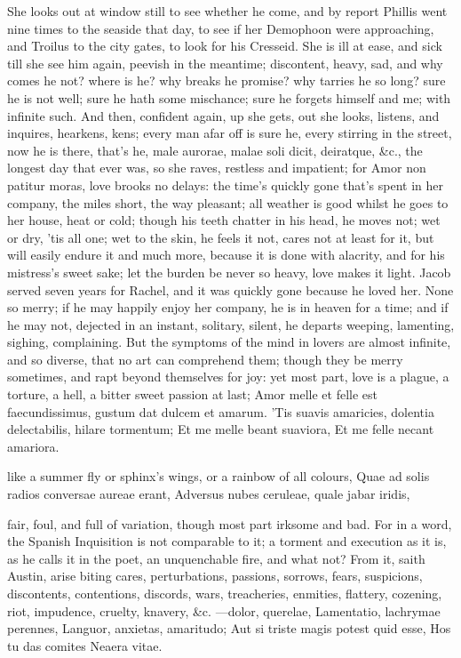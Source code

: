 {She looks out at window still to see whether he come, and by
report Phillis went nine times to the seaside that day, to see if her
Demophoon were approaching, and Troilus to the city gates, to
look for his Cresseid. She is ill at ease, and sick till she see him
again, peevish in the meantime; discontent, heavy, sad, and why comes
he not? where is he? why breaks he promise? why tarries he so long?
sure he is not well; sure he hath some mischance; sure he forgets
himself and me; with infinite such. And then, confident again, up she
gets, out she looks, listens, and inquires, hearkens, kens; every man
afar off is sure he, every stirring in the street, now he is there,
that's he, male aurorae, malae soli dicit, deiratque, \&c., the longest
day that ever was, so she raves, restless and impatient; for Amor non
patitur moras, love brooks no delays: the time's quickly gone that's
spent in her company, the miles short, the way pleasant; all weather is
good whilst he goes to her house, heat or cold; though his teeth
chatter in his head, he moves not; wet or dry, 'tis all one; wet to the
skin, he feels it not, cares not at least for it, but will easily
endure it and much more, because it is done with alacrity, and for his
mistress's sweet sake; let the burden be never so heavy, love makes it
light. Jacob served seven years for Rachel, and it was quickly
gone because he loved her. None so merry; if he may happily enjoy her
company, he is in heaven for a time; and if he may not, dejected in an
instant, solitary, silent, he departs weeping, lamenting, sighing,
complaining.
But the symptoms of the mind in lovers are almost infinite, and so
diverse, that no art can comprehend them; though they be merry
sometimes, and rapt beyond themselves for joy: yet most part, love is a
plague, a torture, a hell, a bitter sweet passion at last; Amor
melle et felle est faecundissimus, gustum dat dulcem et amarum. 'Tis
suavis amaricies, dolentia delectabilis, hilare tormentum;
Et me melle beant suaviora,
Et me felle necant amariora.

like a summer fly or sphinx's wings, or a rainbow of all colours,
Quae ad solis radios conversae aureae erant,
Adversus nubes ceruleae, quale jabar iridis,

fair, foul, and full of variation, though most part irksome and bad.
For in a word, the Spanish Inquisition is not comparable to it; a
torment and execution as it is, as he calls it in the poet, an
unquenchable fire, and what not? From it, saith Austin, arise
biting cares, perturbations, passions, sorrows, fears, suspicions,
discontents, contentions, discords, wars, treacheries, enmities,
flattery, cozening, riot, impudence, cruelty, knavery, \&c.
---dolor, querelae,
Lamentatio, lachrymae perennes,
Languor, anxietas, amaritudo;
Aut si triste magis potest quid esse,
Hos tu das comites Neaera vitae.

}
